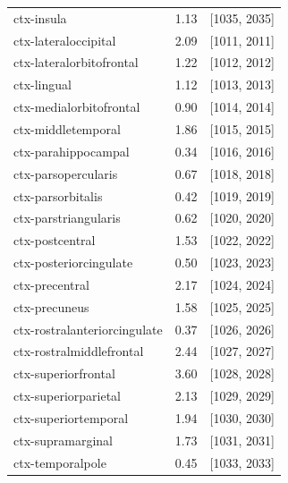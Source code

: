 \documentclass[pdflatex,sn-nature]{sn-jnl}%
\theoremstyle{thmstyleone}%
\theoremstyle{thmstyletwo}%
\theoremstyle{thmstylethree}%
\begin{document}
\begin{appendices}
\begin{small}
\begin{longtable}{l|r|l}
                  ctx-insula &                1.13 &              [1035, 2035] \\
        ctx-lateraloccipital &                2.09 &              [1011, 2011] \\
    ctx-lateralorbitofrontal &                1.22 &              [1012, 2012] \\
                 ctx-lingual &                1.12 &              [1013, 2013] \\
     ctx-medialorbitofrontal &                0.90 &              [1014, 2014] \\
          ctx-middletemporal &                1.86 &              [1015, 2015] \\
         ctx-parahippocampal &                0.34 &              [1016, 2016] \\
         ctx-parsopercularis &                0.67 &              [1018, 2018] \\
           ctx-parsorbitalis &                0.42 &              [1019, 2019] \\
        ctx-parstriangularis &                0.62 &              [1020, 2020] \\
             ctx-postcentral &                1.53 &              [1022, 2022] \\
      ctx-posteriorcingulate &                0.50 &              [1023, 2023] \\
              ctx-precentral &                2.17 &              [1024, 2024] \\
               ctx-precuneus &                1.58 &              [1025, 2025] \\
ctx-rostralanteriorcingulate &                0.37 &              [1026, 2026] \\
    ctx-rostralmiddlefrontal &                2.44 &              [1027, 2027] \\
         ctx-superiorfrontal &                3.60 &              [1028, 2028] \\
        ctx-superiorparietal &                2.13 &              [1029, 2029] \\
        ctx-superiortemporal &                1.94 &              [1030, 2030] \\
           ctx-supramarginal &                1.73 &              [1031, 2031] \\
            ctx-temporalpole &                0.45 &              [1033, 2033] \\
\end{longtable}
\end{small}




\end{appendices}
\end{document}
